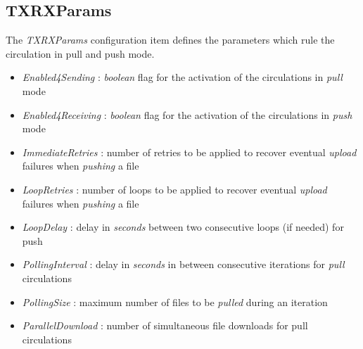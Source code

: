 \documentclass[dec_sum_main.tex]{subfiles}
\begin{document}
\subsection{TXRXParams}
The \textit{TXRXParams} configuration item defines the parameters which rule the circulation in pull and push mode.
\par
\noindent
\begin{itemize}
	\item \textit{Enabled4Sending} : \textit{boolean} flag for the activation of the circulations in \textit{pull} mode
	\item \textit{Enabled4Receiving} : \textit{boolean} flag for the activation of the circulations in \textit{push} mode
	\item \textit{ImmediateRetries} : number of retries to be applied to recover eventual \textit{upload} failures when \textit{pushing} a file
	\item \textit{LoopRetries} : number of loops to be applied to recover eventual \textit{upload} failures when \textit{pushing} a file
	\item \textit{LoopDelay} : delay in \textit{seconds} between two consecutive loops (if needed) for push
	\item \textit{PollingInterval} : delay in \textit{seconds} in between consecutive iterations for \textit{pull} circulations
	\item \textit{PollingSize} : maximum number of files to be \textit{pulled} during an iteration   
	\item \textit{ParallelDownload} : number of simultaneous file downloads for pull circulations
\end{itemize}
\end{document}
